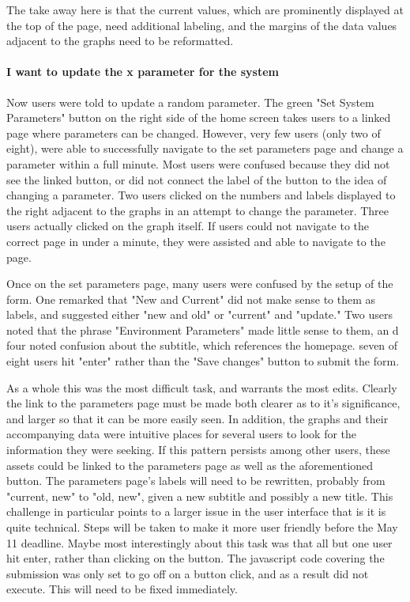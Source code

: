 \documentclass[IEEEtran,letterpaper,10pt,titlepage,fleqn,draftclsnofoot,onecolumn]{article}
\begin{document}
The take away here is that the current values, which are prominently displayed at the top of the page, need additional labeling, and the margins of the data values adjacent to the graphs need to be reformatted.

\paragraph{I want to update the x parameter for the system}

Now users were told to update a random parameter. The green "Set System Parameters" button on the right side of the home screen takes users to a linked page where parameters can be changed. However, very few users (only two of eight), were able to successfully navigate to the set parameters page and change a parameter within a full minute. Most users were confused because they did not see the linked button, or did not connect the label of the button to the idea of changing a parameter. Two users clicked on the numbers and labels displayed to the right adjacent to the graphs in an attempt to change the parameter. Three users actually clicked on the graph itself. If users could not navigate to the correct page in under a minute, they were assisted and able to navigate to the page.

Once on the set parameters page, many users were confused by the setup of the form. One remarked that "New and Current" did not make sense to them as labels, and suggested either "new and old" or "current" and "update." Two users noted that the phrase "Environment Parameters" made little sense to them, an d four noted confusion about the subtitle, which references the homepage. seven of eight users hit "enter" rather than the "Save changes" button to submit the form.

As a whole this was the most difficult task, and warrants the most edits. Clearly the link to the parameters page must be made both clearer as to it's significance, and larger so that it can be more easily seen. In addition, the graphs and their accompanying data were intuitive places for several users to look for the information they were seeking. If this pattern persists among other users, these assets could be linked to the parameters page as well as the aforementioned button. The parameters page's labels will need to be rewritten, probably from "current, new" to "old, new", given a new subtitle and possibly a new title. This challenge in particular points to a larger issue in the user interface that is it is quite technical. Steps will be taken to make it more user friendly before the May 11 deadline. Maybe most interestingly about this task was that all but one user hit enter, rather than clicking on the button. The javascript code covering the submission was only set to go off on a button click, and as a result did not execute. This will need to be fixed immediately. 
\end{document}
